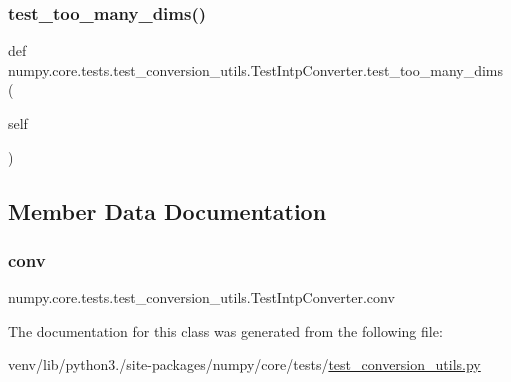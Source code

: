 \subsubsection{\texorpdfstring{test\+\_\+too\+\_\+many\+\_\+dims()}{test\_too\_many\_dims()}}
{\footnotesize\ttfamily def numpy.\+core.\+tests.\+test\+\_\+conversion\+\_\+utils.\+Test\+Intp\+Converter.\+test\+\_\+too\+\_\+many\+\_\+dims (\begin{DoxyParamCaption}\item[{}]{self }\end{DoxyParamCaption})}



\subsection{Member Data Documentation}
\mbox{\label{classnumpy_1_1core_1_1tests_1_1test__conversion__utils_1_1TestIntpConverter_a13ddaa99d8b9df5be9ca0a98954758c1}} 
\subsubsection{\texorpdfstring{conv}{conv}}
{\footnotesize\ttfamily numpy.\+core.\+tests.\+test\+\_\+conversion\+\_\+utils.\+Test\+Intp\+Converter.\+conv\hspace{0.3cm}{\ttfamily [static]}}



The documentation for this class was generated from the following file\+:\begin{DoxyCompactItemize}
\item 
venv/lib/python3./site-\/packages/numpy/core/tests/\hyperlink{test__conversion__utils_8py}{test\+\_\+conversion\+\_\+utils.\+py}\end{DoxyCompactItemize}
